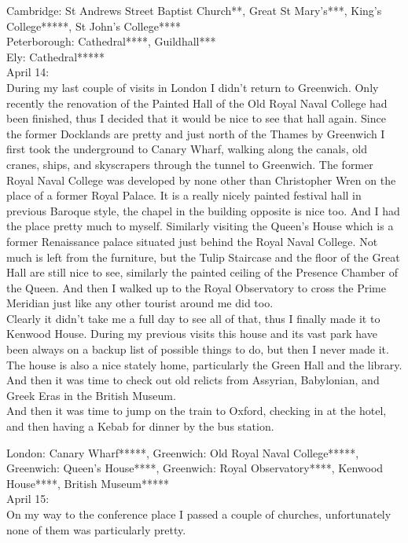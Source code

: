 Cambridge: St Andrews Street Baptist Church**, Great St Mary's***, King's College*****, St John's College****\\
Peterborough: Cathedral****, Guildhall***\\
Ely: Cathedral*****\\

April 14:\\
During my last couple of visits in London I didn't return to Greenwich. Only recently the renovation of the Painted Hall of the Old Royal Naval College had been finished, thus I decided that it would be nice to see that hall again. Since the former Docklands are pretty and just north of the Thames by Greenwich I first took the underground to Canary Wharf, walking along the canals, old cranes, ships, and skyscrapers through the tunnel to Greenwich. The former Royal Naval College was developed by none other than Christopher Wren on the place of a former Royal Palace. It is a really nicely painted festival hall in previous Baroque style, the chapel in the building opposite is nice too. And I had the place pretty much to myself. Similarly visiting the Queen's House which is a former Renaissance palace situated just behind the Royal Naval College. Not much is left from the furniture, but the Tulip Staircase and the floor of the Great Hall are still nice to see, similarly the painted ceiling of the Presence Chamber of the Queen. And then I walked up to the Royal Observatory to cross the Prime Meridian just like any other tourist around me did too.\\
Clearly it didn't take me a full day to see all of that, thus I finally made it to Kenwood House. During my previous visits this house and its vast park have been always on a backup list of possible things to do, but then I never made it. The house is also a nice stately home, particularly the Green Hall and the library. And then it was time to check out old relicts from Assyrian, Babylonian, and Greek Eras in the British Museum.\\
And then it was time to jump on the train to Oxford, checking in at the hotel, and then having a Kebab for dinner by the bus station.

London: Canary Wharf*****, Greenwich: Old Royal Naval College*****, Greenwich: Queen's House****, Greenwich: Royal Observatory****, Kenwood House****, British Museum*****\\

April 15: \\
On my way to the conference place I passed a couple of churches, unfortunately none of them was particularly pretty.

